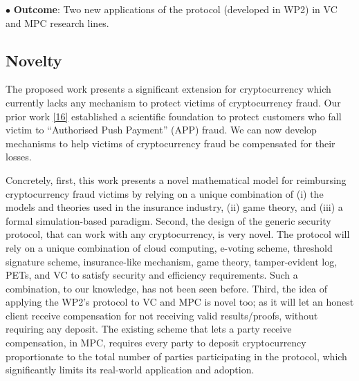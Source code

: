  
   \noindent$\bullet$\textbf{ Outcome}: Two new applications of the protocol (developed in WP2) in VC and MPC research lines. %
 
 
 \subsection{Novelty}
 
 The proposed work presents a significant extension for cryptocurrency which currently lacks any mechanism to protect victims of cryptocurrency fraud.  Our prior work \href{https://eprint.iacr.org/2022/107.pdf}{[16]} established a scientific foundation to protect customers who fall victim to “Authorised Push Payment” (APP) fraud. We can now develop mechanisms to help victims of cryptocurrency fraud be compensated for their losses.
 
 
 
 

 Concretely, first, this work presents a novel mathematical model for reimbursing cryptocurrency fraud victims by relying on a unique combination of (i) the models and theories used in the insurance industry, (ii) game theory, and (iii) a formal simulation-based paradigm. Second, the design of the generic security protocol, that can work with any cryptocurrency, is very novel. The protocol will rely on a unique combination of cloud computing, e-voting scheme, threshold signature scheme, insurance-like mechanism, game theory, tamper-evident log, PETs, and VC to satisfy security and efficiency requirements. Such a combination, to our knowledge, has not been seen before. 
 Third, the idea of applying the WP2's protocol to VC and MPC is novel too; as it will let an honest client receive compensation for not receiving valid results/proofs, without requiring any deposit. The existing scheme that lets a party receive compensation,  in MPC, requires every party to deposit cryptocurrency proportionate to the total number of parties participating in the protocol, which significantly limits its real-world application and adoption.
 

